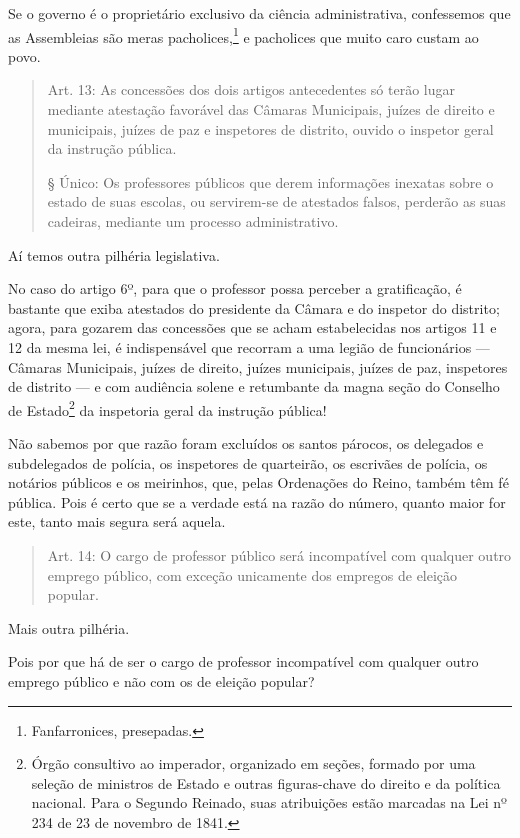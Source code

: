 Se o governo é o proprietário exclusivo da ciência administrativa,
confessemos que as Assembleias são meras pacholices,\footnote{
  Fanfarronices, presepadas.} e pacholices que muito caro custam ao
povo.

\begin{quote}
Art. 13: As concessões dos dois artigos antecedentes só terão lugar
mediante atestação favorável das Câmaras Municipais, juízes de direito e
municipais, juízes de paz e inspetores de distrito, ouvido o inspetor
geral da instrução pública.

§ Único: Os professores públicos que derem informações inexatas sobre o
estado de suas escolas, ou servirem-se de atestados falsos, perderão as
suas cadeiras, mediante um processo administrativo.
\end{quote}

Aí temos outra pilhéria legislativa.

No caso do artigo 6º, para que o professor possa perceber a
gratificação, é bastante que exiba atestados do presidente da Câmara e
do inspetor do distrito; agora, para gozarem das concessões que se acham
estabelecidas nos artigos 11 e 12 da mesma lei, é indispensável que
recorram a uma legião de funcionários --- Câmaras Municipais, juízes de
direito, juízes municipais, juízes de paz, inspetores de distrito --- e
com audiência solene e retumbante da magna seção do Conselho de
Estado\footnote{Órgão consultivo ao imperador, organizado em seções,
  formado por uma seleção de ministros de Estado e outras figuras-chave
  do direito e da política nacional. Para o Segundo Reinado, suas
  atribuições estão marcadas na Lei nº\,234 de 23 de novembro de 1841.}
da inspetoria geral da instrução pública!

Não sabemos por que razão foram excluídos os santos párocos, os
delegados e subdelegados de polícia, os inspetores de quarteirão, os
escrivães de polícia, os notários públicos e os meirinhos, que, pelas
Ordenações do Reino, também têm fé pública. Pois é certo que se a
verdade está na razão do número, quanto maior for este, tanto mais
segura será aquela.

\begin{quote}
Art. 14: O cargo de professor público será incompatível com qualquer
outro emprego público, com exceção unicamente dos empregos de eleição
popular.
\end{quote}

Mais outra pilhéria.

Pois por que há de ser o cargo de professor incompatível com qualquer
outro emprego público e não com os de eleição popular?

